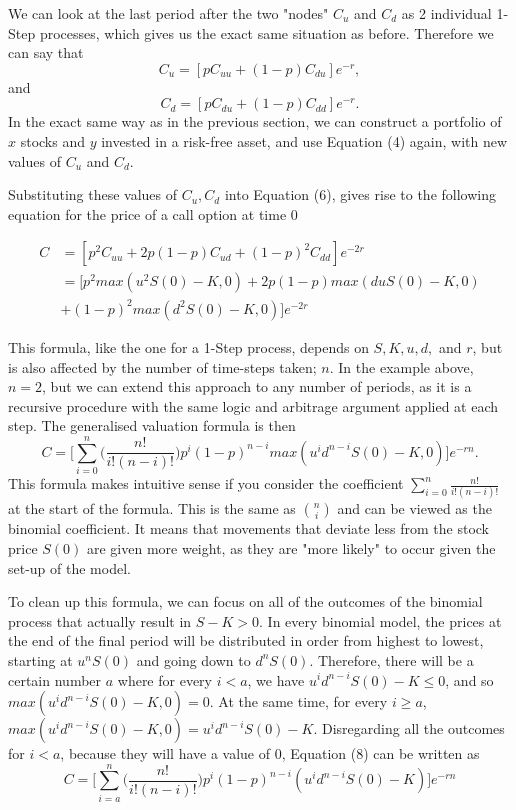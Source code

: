 \documentclass[letterpaper,12pt]{article}
\theoremstyle{plain}
\numberwithin{equation}{section}
\begin{document}
We can look at the last period after the two "nodes" $C_u$ and $C_d$ as 2 individual 1-Step processes, which gives us the exact same situation as before. Therefore we can say that 
\begin{equation*}
	C_u = [pC_{uu} + (1-p)C_{du}]e^{-r},
\end{equation*}
and 
\begin{equation*}
	C_d = [pC_{du} + (1-p)C_{dd}]e^{-r}.
\end{equation*}
In the exact same way as in the previous section, we can construct a portfolio of $x$ stocks and $y$ invested in a risk-free asset, and use Equation (4) again, with new values of $C_u$ and $C_d$.

Substituting these values of $C_u, C_d$ into Equation (6), gives rise to the following equation for the price of a call option at time 0

\begin{equation}
\begin{aligned}
 	C& = [p^2 C_{uu} + 2p(1-p)C_{ud} + (1-p)^2 C_{dd}]e^{-2r}\\
 	& = [p^2 max(u^2S(0) - K,0) + 2p(1-p)max(duS(0) - K,0) \\
 	& + (1-p)^2 max(d^2S(0) - K,0)]e^{-2r}
\end{aligned}
\end{equation}

This formula, like the one for a 1-Step process, depends on $S, K, u, d,$ and $r$, but is also affected by the number of time-steps taken; $n$. In the example above, $n=2$, but we can extend this approach to any number of periods, as it is a recursive procedure with the same logic and arbitrage argument applied at each step. The generalised valuation formula is then
\begin{equation}
	C = \Bigg[ \sum_{i=0}^{n} \bigg(  \frac{n!}{i!(n-i)!}\bigg)p^i (1-p)^{n-i} max(u^id^{n-i}S(0) - K, 0) \Bigg]e^{-rn}.
\end{equation}
This formula makes intuitive sense if you consider the coefficient $\sum_{i=0}^{n}\frac{n!}{i!(n-i)!}$ at the start of the formula. This is the same as $\binom{n}{i}$ and can be viewed as the binomial coefficient. It means that movements that deviate less from the stock price $S(0)$ are given more weight, as they are "more likely" to occur given the set-up of the model.

To clean up this formula, we can focus on all of the outcomes of the binomial process that actually result in $S-K > 0$. In every binomial model, the prices at the end of the final period will be distributed in order from highest to lowest, starting at $u^nS(0)$ and going down to $d^nS(0)$. Therefore, there will be a certain number $a$ where for every $i < a$, we have $u^id^{n-i}S(0)- K \leq 0$, and so $max(u^id^{n-i}S(0)- K, 0) = 0$. At the same time, for every $i \geq a$, $max(u^id^{n-i}S(0)- K, 0) = u^id^{n-i}S(0)- K.$ Disregarding all the outcomes for $i < a$, because they will have a value of $0$, Equation (8) can be written as
\begin{equation}
	C = \Bigg[ \sum_{i=a}^{n} \bigg(  \frac{n!}{i!(n-i)!}\bigg)p^i (1-p)^{n-i} (u^id^{n-i}S(0) - K) \Bigg]e^{-rn}
\end{equation}
\end{document}
